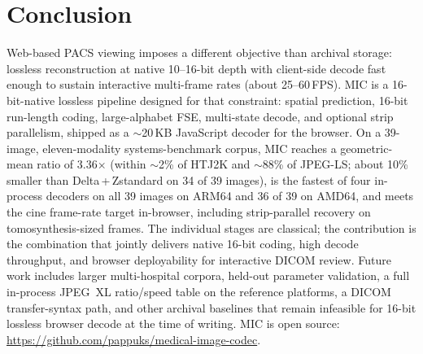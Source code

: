\documentclass[journal]{IEEEtran}
\begin{document}
\section{Conclusion}
\label{sec:conclusion}

Web-based PACS viewing imposes a different objective than archival storage:
lossless reconstruction at native 10--16-bit depth with client-side decode fast
enough to sustain interactive multi-frame rates (about 25--60\,FPS). MIC is a
16-bit-native lossless pipeline designed for that constraint: spatial prediction,
16-bit run-length coding, large-alphabet FSE, multi-state decode, and optional
strip parallelism, shipped as a ${\sim}$20\,KB JavaScript decoder for the browser.
On a 39-image, eleven-modality systems-benchmark corpus, MIC reaches a
geometric-mean ratio of 3.36$\times$ (within ${\sim}$2\% of HTJ2K and
${\sim}$88\% of JPEG-LS; about 10\% smaller than Delta\,+\,Zstandard on 34 of 39
images), is the fastest of four in-process decoders on all 39 images on ARM64 and
36 of 39 on AMD64, and meets the cine frame-rate target in-browser, including
strip-parallel recovery on tomosynthesis-sized frames. The individual stages are
classical; the contribution is the combination that jointly delivers native
16-bit coding, high decode throughput, and browser deployability for interactive
DICOM review. Future work includes larger multi-hospital corpora, held-out
parameter validation, a full in-process JPEG~XL ratio/speed table on the
reference platforms, a DICOM transfer-syntax path, and other archival baselines
that remain infeasible for 16-bit lossless browser decode at the time of writing.
MIC is open source: \url{https://github.com/pappuks/medical-image-codec}.
\end{document}
